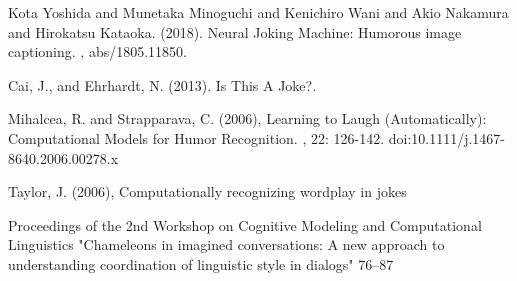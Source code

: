 \documentclass[twoside,twocolumn]{article}
\begin{document}
\begin{thebibliography}{99} %


Kota Yoshida and Munetaka Minoguchi and Kenichiro Wani and Akio Nakamura and Hirokatsu Kataoka. (2018).
\newblock Neural Joking Machine: Humorous image captioning.
, abs/1805.11850.

Cai, J., and Ehrhardt, N. (2013). 
\newblock Is This A Joke?.

Mihalcea, R. and Strapparava, C. (2006), 
\newblock Learning to Laugh (Automatically): Computational Models for Humor Recognition.
, 22: 126-142. doi:10.1111/j.1467-8640.2006.00278.x

Taylor, J. (2006), 
\newblock Computationally recognizing wordplay in jokes

\newblock Proceedings of the 2nd Workshop on Cognitive Modeling and Computational Linguistics "Chameleons in imagined conversations: A new approach to understanding coordination of linguistic style in dialogs"
  76--87

\end{thebibliography}

\end{document}
